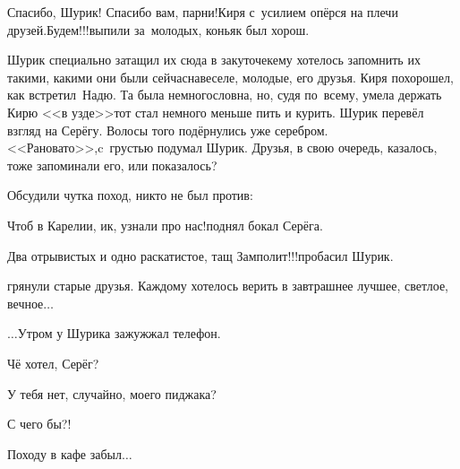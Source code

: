 {\diagdash Спасибо, Шурик! Спасибо вам, парни!\mdash Киря с~усилием опёрся на плечи друзей.\mdash Будем!!!\mdash выпили за~молодых, коньяк был хорош.

Шурик специально затащил их сюда в закуточек\mdash ему хотелось запомнить их такими, какими они были сейчас\mdash навеселе, молодые, его друзья. Киря похорошел, как встретил~Надю. Та была немногословна, но, судя по~всему, умела держать Кирю <<в узде>>\mdash тот стал немного меньше пить и курить. Шурик перевёл взгляд на Серёгу. Волосы того подёрнулись уже серебром. <<Рановато>>,\mdash c~грустью подумал Шурик. Друзья, в свою очередь, казалось, тоже запоминали его, или показалось?

Обсудили чутка поход, никто не был против:

\diagdash Чтоб в Карелии, ик, узнали про нас!\mdash поднял бокал Серёга.

\diagdash Два отрывистых и одно раскатистое, тащ Замполит!!!\mdash пробасил Шурик.

\mdash грянули старые друзья. Каждому хотелось верить в завтрашнее лучшее, светлое, вечное$\ldots$

\vspace{0.7cm}

$\ldots$Утром у Шурика зажужжал телефон. 

\diagdash Чё хотел, Серёг?

\diagdash У тебя нет, случайно, моего пиджака?

\diagdash С чего бы?!

\diagdash Походу в кафе забыл$\ldots$

\begin{center}
\end{center}
}